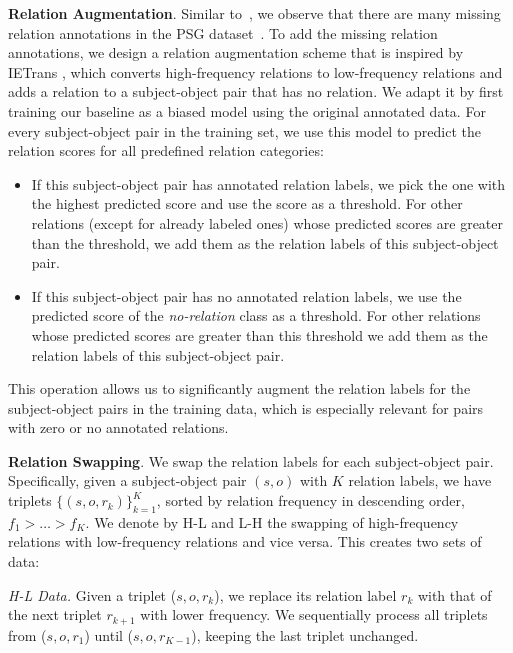 \noindent \textbf{Relation Augmentation}. 
Similar to~\citep{goel2022not}, we observe that there are many missing relation annotations in the PSG dataset~\citep{yang2022panoptic}.
To add the missing relation annotations, we design a relation augmentation scheme that is inspired by IETrans \citep{zhang2022fine}, which converts high-frequency relations to low-frequency relations and adds a relation to a subject-object pair that has no relation.
%
We adapt it by first training our baseline as a biased model using the original annotated data. For every subject-object pair in the training set, we use this model to predict the relation scores for all predefined relation categories: 
\begin{itemize}
    \item If this subject-object pair has annotated relation labels, we pick the one with the highest predicted score and use the score as a threshold. For other relations (except for already labeled ones) whose predicted scores are greater than the threshold, we add them as the relation labels of this subject-object pair.
    \item If this subject-object pair has no annotated relation labels, we use the predicted score of the \emph{no-relation} class as a threshold. For other relations whose predicted scores are greater than this threshold we add them as the relation labels of this subject-object pair.
\end{itemize}
This operation allows us to significantly augment the relation labels for the subject-object pairs in the training data, which is especially relevant for pairs with zero or no annotated relations. 

\noindent \textbf{Relation Swapping}.
We swap the relation labels for each subject-object pair. 
Specifically, given a subject-object pair $(s, o)$ with $K$ relation labels, we have triplets $\{(s, o, r_k)\}_{k=1}^{K}$, sorted by relation frequency in descending order, $f_1 > \dots > f_K$. We denote by H-L and L-H the swapping of high-frequency relations with low-frequency relations and vice versa. This creates two sets of data: 

\emph{H-L Data.}
Given a triplet ($s, o, r_k$), we replace its relation label $r_k$ with that of the next triplet $r_{k+1}$ with lower frequency. We sequentially process all triplets from ($s, o, r_1$) until ($s, o, r_{K-1}$), keeping the last triplet unchanged. 

